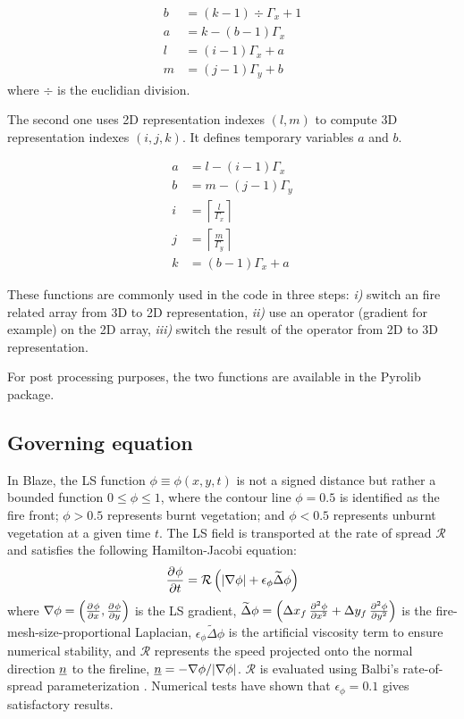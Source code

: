 \begin{align}
  b &= (k-1) \div \Gamma_x + 1 \nonumber \\
  a &= k - (b-1)\Gamma_x \nonumber \\
  l &= (i-1)\Gamma_x + a \\
  m &= (j-1)\Gamma_y + b 
\end{align}
where $\div$ is the euclidian division.

\medskip

The second one uses 2D representation indexes $(l, m)$ to compute 3D representation indexes $(i,j,k)$. It defines temporary variables $a$ and $b$.

\begin{align}
	a &= l - (i-1)\Gamma_x \nonumber \\
	b &= m - (j-1)\Gamma_y \nonumber \\
	i &= \left \lceil \frac{l}{\Gamma_x} \right \rceil \\
	j &= \left \lceil \frac{m}{\Gamma_y} \right \rceil \\
	k &= (b-1)\Gamma_x + a
\end{align}

These functions are commonly used in the code in three steps: \textit{i)} switch an fire related array from 3D to 2D representation, \textit{ii)} use an operator (gradient for example) on the 2D array, \textit{iii)} switch the result of the operator from 2D to 3D representation.

For post processing purposes, the two functions are available in the Pyrolib package.

\subsection{Governing equation}
\label{sec:governingeq}

In Blaze, the LS function $\phi \equiv \phi(x,y,t)$ is not a signed distance but rather a bounded function $0 \leqslant \phi \leqslant 1$, where the contour line $\phi = 0.5$ is identified as the fire front; $\phi > 0.5$ represents burnt vegetation; and $\phi < 0.5$ represents unburnt vegetation at a given time $t$. The LS field is transported at the rate of spread $\mathcal R$ and satisfies the following Hamilton-Jacobi equation:
\begin{equation}
\dpar{\phi}{t}{} = \mathcal R \left (|\nabla \phi | + \epsilon_\phi \widetilde \Delta \phi \right )
\label{eq:lveq}
\end{equation}
where $\nabla \phi = \left ( \dpar{\phi}{x}{}, \dpar{\phi}{y}{} \right )$ is the LS gradient, $\widetilde \Delta \phi = \left ( \Delta x_f\,\dpar{\phi}{x^2}{2} + \Delta y_f\,\dpar{\phi}{y^2}{2} \right )$ is the fire-mesh-size-proportional Laplacian, $\epsilon_\phi \widetilde \Delta \phi$ is the artificial viscosity term to ensure numerical stability, and $\mathcal{R}$ represents the speed projected onto the normal direction $\uvec n$ to the fireline, 
$\uvec n = -\nabla \phi/|\nabla \phi |$. $\mathcal{R}$ is evaluated using Balbi's rate-of-spread parameterization \citep{Santoni2011}.
Numerical tests have shown that $\epsilon_\phi = 0.1$ gives satisfactory results.

